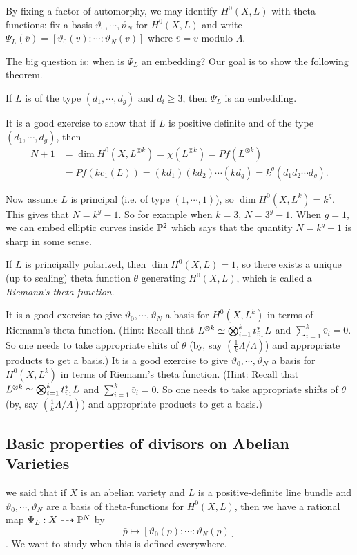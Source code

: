 By fixing a factor of automorphy, we may identify $H^0(X,L)$ with theta functions: fix a basis $\vartheta_0,\cdots,\vartheta_N$ for $H^0(X,L)$ and write $\Psi_L(\overline{v})=[\vartheta_0(v):\cdots:\vartheta_N(v)]$ where $\overline{v}=v$ modulo $\Lambda$. 

The big question is: when is $\Psi_L$ an embedding? Our goal is to show the following theorem.
\begin{theorem}[Lefschetz]
If $L$ is of the type $(d_1,\cdots,d_g)$ and $d_i\geq 3$, then $\Psi_L$ is an embedding.
\end{theorem}

\begin{example}
It is a good exercise to show that if $L$ is positive definite and of the type $(d_1,\cdots,d_g)$, then 
\begin{align*}
N+1 &=\dim H^0(X,L^{\otimes k})=\chi(L^{\otimes k})=Pf(L^{\otimes k})\\
&=Pf(k c_1(L))=(kd_1)(kd_2)\cdots (kd_g)=k^g(d_1d_2\cdots d_g).
\end{align*}

Now assume $L$ is principal (i.e. of type $(1,\cdots,1)$), so $\dim H^0(X,L^k)=k^g$. This gives that $N=k^g-1$. So for example when $k=3$, $N=3^g-1$. When $g=1$, we can embed elliptic curves inside ${\mathbb P}^2$ which says that the quantity $N=k^g-1$ is sharp in some sense. 
\end{example}

If $L$ is principally polarized, then $\dim H^0(X,L)=1$, so there exists a unique (up to scaling) theta function $\theta$ generating $H^0(X,L)$, which is called a \emph{Riemann's theta function}. 

It is a good exercise to give $\vartheta_0,\cdots,\vartheta_N$ a basis for $H^0(X,L^{k})$ in terms of Riemann's theta function. (Hint: Recall that $L^{\otimes k}\simeq \bigotimes_{i=1}^k t_{\bar{v}_1}^* L$ and $\sum_{i=1}^k \bar{v}_i=0$. So one needs to take appropriate shits of $\theta$ (by, say $(\frac{1}{k}\Lambda/\Lambda)$) and appropriate products to get a basis.)
It is a good exercise to give $\vartheta_0,\cdots,\vartheta_N$ a basis for $H^0(X,L^{k})$ in terms of Riemann's theta function. (Hint: Recall that $L^{\otimes k}\simeq \bigotimes_{i=1}^k t_{\bar{v}_1}^* L$ and $\sum_{i=1}^k \bar{v}_i=0$. So one needs to take appropriate shifts of $\theta$ (by, say $(\frac{1}{k}\Lambda/\Lambda)$) and appropriate products to get a basis.)

\subsection{Basic properties of divisors on Abelian Varieties}
we said that if $X$ is an abelian variety and $L$ is a positive-definite line bundle and $\vartheta_0,\cdots, \vartheta_N$ are a basis of theta-functions for $H^0(X,L)$, then we have a rational map $\Psi_L: X\dashrightarrow {\mathbb P}^N$ by
$$\bar{p}\mapsto [\vartheta_0(p):\cdots:\vartheta_N(p)]$$. We want to study when this is defined everywhere.

